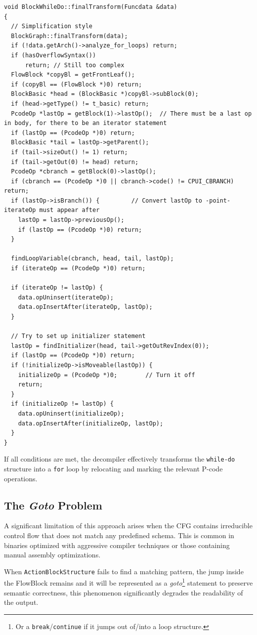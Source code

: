 \begin{lstlisting}[style=Cstyle]
void BlockWhileDo::finalTransform(Funcdata &data)
{
  // Simplification style
  BlockGraph::finalTransform(data);
  if (!data.getArch()->analyze_for_loops) return;
  if (hasOverflowSyntax()) 
      return; // Still too complex
  FlowBlock *copyBl = getFrontLeaf();
  if (copyBl == (FlowBlock *)0) return;
  BlockBasic *head = (BlockBasic *)copyBl->subBlock(0);
  if (head->getType() != t_basic) return;
  PcodeOp *lastOp = getBlock(1)->lastOp();	// There must be a last op in body, for there to be an iterator statement
  if (lastOp == (PcodeOp *)0) return;
  BlockBasic *tail = lastOp->getParent();
  if (tail->sizeOut() != 1) return;
  if (tail->getOut(0) != head) return;
  PcodeOp *cbranch = getBlock(0)->lastOp();
  if (cbranch == (PcodeOp *)0 || cbranch->code() != CPUI_CBRANCH) return;
  if (lastOp->isBranch()) {			// Convert lastOp to -point- iterateOp must appear after
    lastOp = lastOp->previousOp();
    if (lastOp == (PcodeOp *)0) return;
  }

  findLoopVariable(cbranch, head, tail, lastOp);
  if (iterateOp == (PcodeOp *)0) return;

  if (iterateOp != lastOp) {
    data.opUninsert(iterateOp);
    data.opInsertAfter(iterateOp, lastOp);
  }

  // Try to set up initializer statement
  lastOp = findInitializer(head, tail->getOutRevIndex(0));
  if (lastOp == (PcodeOp *)0) return;
  if (!initializeOp->isMoveable(lastOp)) {
    initializeOp = (PcodeOp *)0;		// Turn it off
    return;
  }
  if (initializeOp != lastOp) {
    data.opUninsert(initializeOp);
    data.opInsertAfter(initializeOp, lastOp);
  }
}
\end{lstlisting}

If all conditions are met, the decompiler effectively transforms the \texttt{while-do} structure into a \texttt{for} loop by relocating and marking the relevant P-code operations.

\subsection{The \emph{Goto} Problem}
A significant limitation of this approach arises when the \ac{CFG} contains irreducible control flow 
that does not match any predefined schema. This is common in binaries optimized with aggressive compiler 
techniques or those containing manual assembly optimizations.

When \texttt{ActionBlockStructure} fails to find a matching pattern, the jump inside the FlowBlock remains and it 
will be represented as a \emph{goto}\footnote{Or a \texttt{break}/\texttt{continue} if it jumps out of/into a loop structure.}
statement to preserve semantic correctness, this phenomenon significantly degrades the readability of the output.

